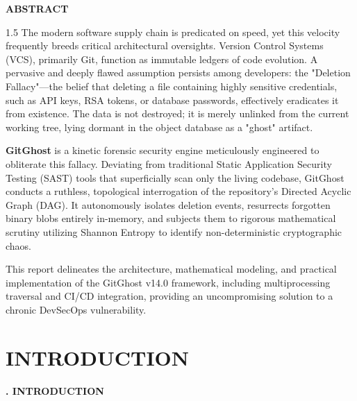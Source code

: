 \documentclass[12pt, a4paper, oneside]{report}
\begin{document}
\begin{center}
    {\Large \textbf{ABSTRACT} \par}
\end{center}
\vspace{1cm}
\begin{spacing}{1.5}
The modern software supply chain is predicated on speed, yet this velocity frequently breeds critical architectural oversights. Version Control Systems (VCS), primarily Git, function as immutable ledgers of code evolution. A pervasive and deeply flawed assumption persists among developers: the "Deletion Fallacy"---the belief that deleting a file containing highly sensitive credentials, such as API keys, RSA tokens, or database passwords, effectively eradicates it from existence. The data is not destroyed; it is merely unlinked from the current working tree, lying dormant in the object database as a "ghost" artifact.

\textbf{GitGhost} is a kinetic forensic security engine meticulously engineered to obliterate this fallacy. Deviating from traditional Static Application Security Testing (SAST) tools that superficially scan only the living codebase, GitGhost conducts a ruthless, topological interrogation of the repository's Directed Acyclic Graph (DAG). It autonomously isolates deletion events, resurrects forgotten binary blobs entirely in-memory, and subjects them to rigorous mathematical scrutiny utilizing Shannon Entropy to identify non-deterministic cryptographic chaos. 

This report delineates the architecture, mathematical modeling, and practical implementation of the GitGhost v14.0 framework, including multiprocessing traversal and CI/CD integration, providing an uncompromising solution to a chronic DevSecOps vulnerability.
\end{spacing}
\newpage

\renewcommand{\contentsname}{\centering \Large \textbf{CONTENTS}}
\tableofcontents
\newpage
\listoffigures
\newpage


\chapter{INTRODUCTION}
\begin{center}
    {\Large \textbf{\thechapter. INTRODUCTION} \par}
\end{center}
\vspace{1cm}
\end{document}
